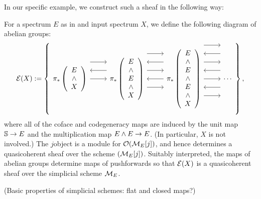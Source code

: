 In our specific example, we construct such a sheaf in the following way:

\begin{definition}\label{DefnHomologyFunctorsValuedInSheaves}
For a spectrum $E$ as in  and input spectrum $X$, we define the following diagram of abelian groups:
\[\sheaf{E}(X) := \left\{
\begin{tikzcd}
\pi_* \left( \begin{array}{c} E \\ \sm \\ X \end{array} \right) \arrow[leftarrow, shift left=\baselineskip]{r} \arrow[shift left=(2*\baselineskip)]{r} \arrow{r} &
\pi_* \left( \begin{array}{c} E \\ \sm \\ E \\ \sm \\ X \end{array} \right) \arrow[shift left=(3*\baselineskip)]{r} \arrow[leftarrow, shift left=(2*\baselineskip)]{r} \arrow[shift left=\baselineskip]{r} \arrow[leftarrow]{r} \arrow[shift right=\baselineskip]{r} &
\pi_* \left( \begin{array}{c} E \\ \sm \\ E \\ \sm \\ E \\ \sm \\ X \end{array} \right) \arrow[shift left=(4*\baselineskip)]{r} \arrow[leftarrow, shift left=(3*\baselineskip)]{r} \arrow[shift left=(2*\baselineskip)]{r} \arrow[leftarrow, shift left=\baselineskip]{r} \arrow{r} \arrow[leftarrow, shift right=\baselineskip]{r} \arrow[shift right=(2*\baselineskip)]{r} &
\cdots
\end{tikzcd}
\right\},\]
where all of the coface and codegeneracy maps are induced by the unit map $\S \to E$ and the multiplication map $E \sm E \to E$.  (In particular, $X$ is not involved.)  The $j$\th object is a module for $\sheaf{O}(\sheaf M_E[j])$, and hence determines a quasicoherent sheaf over the scheme $(\sheaf M_E[j])$.  Suitably interpreted, the maps of abelian groups determine maps of pushforwards so that $\sheaf{E}(X)$ is a quasicoherent sheaf over the simplicial scheme $\sheaf M_E$.
\end{definition}

(Basic properties of simplicial schemes: flat and closed maps?)

